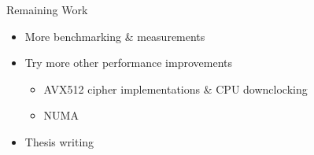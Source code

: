 \documentclass[NET,english]{tumbeamer}
\begin{document}
%	
%	

\begin{frame}{Remaining Work}
	\begin{itemize}
		\item More benchmarking \& measurements
		\item Try more other performance improvements
		\begin{itemize}
			\item AVX512 cipher implementations \& CPU downclocking
			\item NUMA
		\end{itemize}
		\item Thesis writing
	\end{itemize}
\end{frame}

%    
%    
\end{document}
